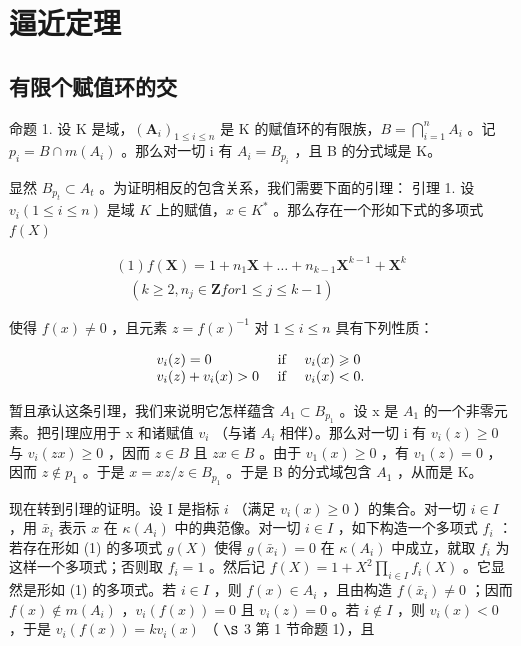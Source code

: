 \section{逼近定理}

\subsection{有限个赋值环的交}

命题 1. 设 K 是域，\((\mathbf{A}_{i})_{1 \leqslant i \leqslant n}\) 是 K 的赋值环的有限族，\(B = \bigcap_{i=1}^{n} A_{i}\) 。记 \(p_{i} = B \cap m(A_{i})\) 。那么对一切 i 有 \(A_{i} = B_{p_{i}}\) ，且 B 的分式域是 K。

显然 \(B_{p_t} \subset A_t\) 。为证明相反的包含关系，我们需要下面的引理： 引理 1. 设 \(v_i (1 \leqslant i \leqslant n)\) 是域 \(K\) 上的赋值，\(x \in K^*\) 。那么存在一个形如下式的多项式 \(f(X)\)

\[
\begin{array}{l} (1) f (\mathbf {X}) = 1 + n _ {1} \mathbf {X} + \dots + n _ {k - 1} \mathbf {X} ^ {k - 1} + \mathbf {X} ^ {k} \\ \quad (k \geqslant 2, n _ {j} \in \mathbf {Z} for 1 \leqslant j \leqslant k - 1) \end{array}
\]

使得 \(f(x) \neq 0\) ，且元素 \(z = f(x)^{-1}\) 对 \(1 \leqslant i \leqslant n\) 具有下列性质：

\[
\begin{array}{l l} v _ {i} (z) = 0 & \text { if } \quad v _ {i} (x) \geqslant 0 \\ v _ {i} (z) + v _ {i} (x) > 0 & \text { if } \quad v _ {i} (x) <   0. \end{array}
\]

暂且承认这条引理，我们来说明它怎样蕴含 \(A_{1} \subset B_{p_{1}}\) 。设 x 是 \(A_{1}\) 的一个非零元素。把引理应用于 x 和诸赋值 \(v_{i}\) （与诸 \(A_{i}\) 相伴）。那么对一切 i 有 \(v_{i}(z) \geqslant 0\) 与 \(v_{i}(zx) \geqslant 0\) ，因而 \(z \in B\) 且 \(zx \in B\) 。由于 \(v_{1}(x) \geqslant 0\) ，有 \(v_{1}(z) = 0\) ，因而 \(z \notin p_{1}\) 。于是 \(x = xz/z \in B_{p_{1}}\) 。于是 B 的分式域包含 \(A_{1}\) ，从而是 K。

现在转到引理的证明。设 I 是指标 \(i\) （满足 \(v_{i}(x) \geqslant 0\) ）的集合。对一切 \(i \in I\) ，用 \(\bar{x}_{i}\) 表示 \(x\) 在 \(\kappa(A_{i})\) 中的典范像。对一切 \(i \in I\) ，如下构造一个多项式 \(f_{i}\) ：若存在形如 (1) 的多项式 \(g(X)\) 使得 \(g(\bar{x}_{i}) = 0\) 在 \(\kappa(A_{i})\) 中成立，就取 \(f_{i}\) 为这样一个多项式；否则取 \(f_{i} = 1\) 。然后记 \(f(X) = 1 + X^{2} \prod_{i \in I} f_{i}(X)\) 。它显然是形如 (1) 的多项式。若 \(i \in I\) ，则 \(f(x) \in A_{i}\) ，且由构造 \(f(\bar{x}_{i}) \neq 0\) ；因而 \(f(x) \notin m(A_{i})\) ，\(v_{i}(f(x)) = 0\) 且 \(v_{i}(z) = 0\) 。若 \(i \notin I\) ，则 \(v_{i}(x) < 0\) ，于是 \(v_{i}(f(x)) = kv_{i}(x)\) （ \(\S\) 3 第 1 节命题 1），且

